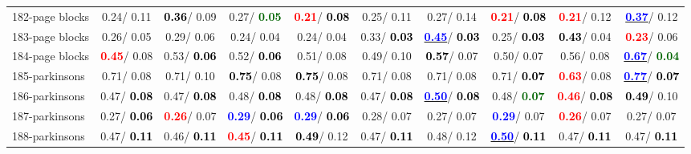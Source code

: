 \begin{table}[h]
\begin{center}
{\begin{tabular}{lc|c|c|c|c|c|c|c|c}
182-page blocks &   0.24/  0.11 & \textcolor{black}{\textbf{  0.36}}/  0.09 &   0.27/\textcolor{darkgreen}{\textbf{  0.05}} & \textcolor{red}{\textbf{  0.21}}/\textcolor{black}{\textbf{  0.08}} &   0.25/  0.11 &   0.27/  0.14 & \textcolor{red}{\textbf{  0.21}}/\textcolor{black}{\textbf{  0.08}} & \textcolor{red}{\textbf{  0.21}}/  0.12 & \underline{\textcolor{blue}{\textbf{  0.37}}}/  0.12 \\
183-page blocks &   0.26/  0.05 &   0.29/  0.06 &   0.24/  0.04 &   0.24/  0.04 &   0.33/\textcolor{black}{\textbf{  0.03}} & \underline{\textcolor{blue}{\textbf{  0.45}}}/\textcolor{black}{\textbf{  0.03}} &   0.25/\textcolor{black}{\textbf{  0.03}} & \textcolor{black}{\textbf{  0.43}}/  0.04 & \textcolor{red}{\textbf{  0.23}}/  0.06 \\
184-page blocks & \textcolor{red}{\textbf{  0.45}}/  0.08 &   0.53/\textcolor{black}{\textbf{  0.06}} &   0.52/\textcolor{black}{\textbf{  0.06}} &   0.51/  0.08 &   0.49/  0.10 & \textcolor{black}{\textbf{  0.57}}/  0.07 &   0.50/  0.07 &   0.56/  0.08 & \underline{\textcolor{blue}{\textbf{  0.67}}}/\textcolor{darkgreen}{\textbf{  0.04}} \\
185-parkinsons &   0.71/  0.08 &   0.71/  0.10 & \textcolor{black}{\textbf{  0.75}}/  0.08 & \textcolor{black}{\textbf{  0.75}}/  0.08 &   0.71/  0.08 &   0.71/  0.08 &   0.71/\textcolor{black}{\textbf{  0.07}} & \textcolor{red}{\textbf{  0.63}}/  0.08 & \underline{\textcolor{blue}{\textbf{  0.77}}}/\textcolor{black}{\textbf{  0.07}} \\
186-parkinsons &   0.47/\textcolor{black}{\textbf{  0.08}} &   0.47/\textcolor{black}{\textbf{  0.08}} &   0.48/\textcolor{black}{\textbf{  0.08}} &   0.48/\textcolor{black}{\textbf{  0.08}} &   0.47/\textcolor{black}{\textbf{  0.08}} & \underline{\textcolor{blue}{\textbf{  0.50}}}/\textcolor{black}{\textbf{  0.08}} &   0.48/\textcolor{darkgreen}{\textbf{  0.07}} & \textcolor{red}{\textbf{  0.46}}/\textcolor{black}{\textbf{  0.08}} & \textcolor{black}{\textbf{  0.49}}/  0.10 \\
187-parkinsons &   0.27/\textcolor{black}{\textbf{  0.06}} & \textcolor{red}{\textbf{  0.26}}/  0.07 & \textcolor{blue}{\textbf{  0.29}}/\textcolor{black}{\textbf{  0.06}} & \textcolor{blue}{\textbf{  0.29}}/\textcolor{black}{\textbf{  0.06}} &   0.28/  0.07 &   0.27/  0.07 & \textcolor{blue}{\textbf{  0.29}}/  0.07 & \textcolor{red}{\textbf{  0.26}}/  0.07 &   0.27/  0.07 \\
188-parkinsons &   0.47/\textcolor{black}{\textbf{  0.11}} &   0.46/\textcolor{black}{\textbf{  0.11}} & \textcolor{red}{\textbf{  0.45}}/\textcolor{black}{\textbf{  0.11}} & \textcolor{black}{\textbf{  0.49}}/  0.12 &   0.47/\textcolor{black}{\textbf{  0.11}} &   0.48/  0.12 & \underline{\textcolor{blue}{\textbf{  0.50}}}/\textcolor{black}{\textbf{  0.11}} &   0.47/\textcolor{black}{\textbf{  0.11}} &   0.47/\textcolor{black}{\textbf{  0.11}} \\ \hline

\end{tabular}}
\end{center}
\end{table}
